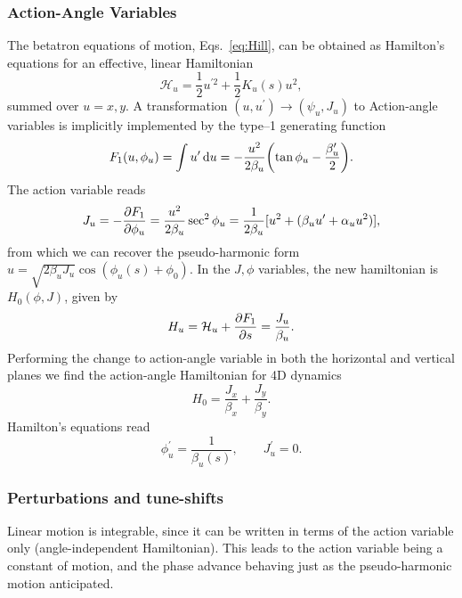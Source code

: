 \subsubsection{Action-Angle Variables}
The betatron equations of motion, Eqs.~\eqref{eq:Hill}, can be obtained as Hamilton's equations for an effective, linear Hamiltonian
\begin{equation}
    \mathcal{H}_u=\frac{1}{2}u^{\prime2}+\frac{1}{2}K_u(s)u^2,
\end{equation}
summed over $u=x,y$.
A transformation $(u,u^\prime)\to(\psi_u, J_u)$ to Action-angle variables is implicitly implemented by the type--1 generating function \cite{lee_accelerator_2004}
\begin{equation}
    F_1(u,\phi_u)=\int{u}^\prime\dd{{u}}=-\frac{u^2}{2\beta_u}\qty(\tan \phi_u-\frac{\beta_u^\prime}{2}).
\end{equation}
The action variable reads
\begin{equation}
    J_u=-\pdv{F_1}{\phi_u} = \frac{u^2}{2\beta_u}\sec^2\phi_u = \frac{1}{2\beta_u}[u^2 + (\beta_u u^\prime + \alpha_u u^2)],
    \label{eq:action}
\end{equation}
from which we can recover the pseudo-harmonic form $u=\sqrt{2\beta_u J_u}\cos(\phi_u(s)+\phi_0)$. In the $J,\phi$ variables, the new hamiltonian is $H_0(\phi, J)$,  given by
\begin{equation}
    H_u=\mathcal{H}_u+\pdv{F_1}{s} = \frac{J_u}{\beta_u}.
\end{equation}
Performing the change to action-angle variable in both the horizontal and vertical planes we find the action-angle Hamiltonian for 4D dynamics
\begin{equation}
    H_0= \frac{J_x}{\beta_x} +  \frac{J_y}{\beta_y}.
\end{equation}
Hamilton's equations read
\begin{equation}
    \phi_u^\prime = \frac{1}{\beta_u(s)},\qquad J_u^\prime=0.
\end{equation}
\subsubsection{Perturbations and tune-shifts}
Linear motion is integrable, since it can be written in terms of the action variable only (angle-independent Hamiltonian). This leads to the action variable being a constant of motion, and the phase advance behaving just as the pseudo-harmonic motion anticipated.

